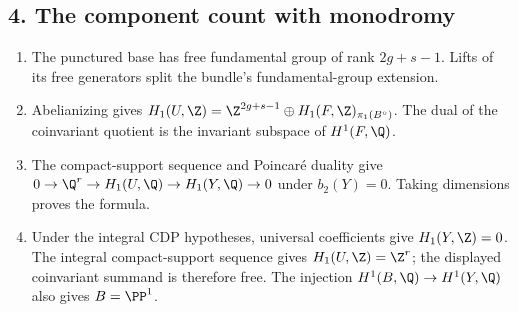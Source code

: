\subsection*{4. The component count with monodromy}
\RungOne
\begin{enumerate}[label=\arabic*.,leftmargin=*]
\item The punctured base has free fundamental group of rank
$2g+s-1$.  Lifts of its free generators split the bundle's
fundamental-group extension.
\item Abelianizing gives
$H_1(U,\Z)=\Z^{2g+s-1}\oplus H_1(F,\Z)_{\pi_1(B^\circ)}$.
The dual of the coinvariant quotient is the invariant subspace
of $H^1(F,\Q)$.
\item The compact-support sequence and Poincar\'e duality give
$0\to\Q^r\to H_1(U,\Q)\to H_1(Y,\Q)\to0$ under
$b_2(Y)=0$.  Taking dimensions proves the formula.
\item Under the integral CDP hypotheses, universal coefficients
give $H_1(Y,\Z)=0$.  The integral compact-support sequence gives
$H_1(U,\Z)=\Z^r$; the displayed coinvariant summand is therefore
free.  The injection $H^1(B,\Q)\to H^1(Y,\Q)$ also gives
$B=\PP^1$.
\end{enumerate}

